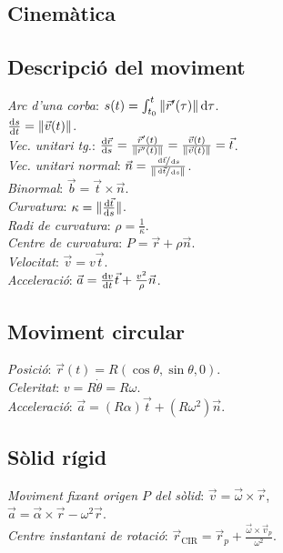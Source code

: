 \documentclass[10pt]{article}
\newcommand{\ci}{\textbullet\;}
\begin{document}
\ifland
\raggedright
\begin{multicols}{4}
\fi

\section{Cinem\`atica}

\subsection{Descripci\'o del moviment}
\emph{Arc d'una corba}: $s(t) = \int^t_{t_0} \|\vec{r}'(\tau)\| \dif\tau$. \\
\ci $\frac{\dif s}{\dif t} = \|\vec{v}(t)\|$. \\
\emph{Vec. unitari tg.}: $\frac{\dif \vec{r}}{\dif s} = \frac{\vec{r}'(t)}{\|\vec{r}'(t)\|} = \frac{\vec{v}(t)}{\|\vec{v}(t)\|} = \vec{t}$. \\
\emph{Vec. unitari normal}: $\vec{n} = \frac{\sfrac{\dif \vec{t}}{\dif s}}{\|\sfrac{\dif \vec{t}}{\dif s}\|}$. \\
\emph{Binormal}: $\vec{b} = \vec{t} \times \vec{n}$. \\
\emph{Curvatura}: $\kappa = \|\frac{\dif \vec{t}}{\dif s}\|$. \\
\emph{Radi de curvatura}: $\rho = \frac{1}{\kappa}$. \\
\emph{Centre de curvatura}: $P = \vec{r} + \rho\vec{n}$.\\
\emph{Velocitat}: $\vec{v} = v\vec{t}$. \\
\emph{Acceleraci\'o}: $\vec{a} = \frac{\dif v}{\dif t}\vec{t} + \frac{v^2}{\rho}\vec{n}$.

\subsection{Moviment circular}
\emph{Posici\'o}: $\vec{r}(t) = R(\cos \theta, \sin \theta, 0)$. \\
\emph{Celeritat}: $v = R\dot\theta = R\omega$. \\
\emph{Acceleraci\'o}: $\vec{a} = (R\alpha)\vec{t} + (R\omega^2)\vec{n}$.

\subsection{S\`olid r\'igid}
\emph{Moviment fixant origen $P$ del sòlid}: $\vec{v} = \vec{\omega} \times \vec{r}$,\\
$\vec{a} =  \vec{\alpha} \times \vec{r} - \omega^2 \vec{r}$.\\
\emph{Centre instantani de rotaci\'o}: $\vec{r}_{\text{CIR}} = \vec{r}_p + \frac{\vec{\omega} \times \vec{v}_p}{\omega^2}$.



\end{multicols}
\end{document}
